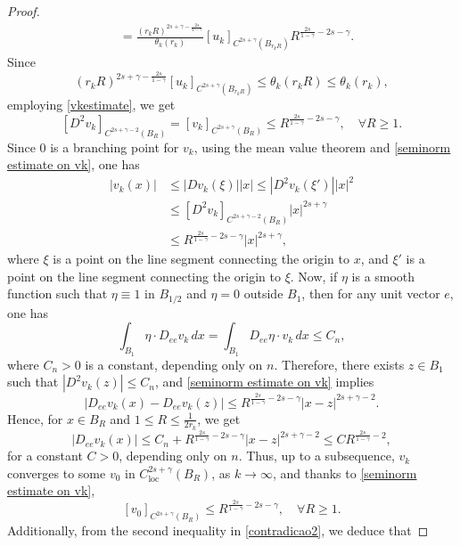 \documentclass[11pt,reqno]{amsart}
\numberwithin{equation}{section}
\numberwithin{theorem}{section}
\numberwithin{lemma}{section}
\numberwithin{corollary}{section}
\numberwithin{remark}{section}
\numberwithin{proposition}{section}
\numberwithin{definition}{section}
\newcommand{\loc}{\operatorname{loc}}
\begin{document}
\begin{proof}
\begin{equation}
\begin{split}
    &=\frac{(r_kR)^{2s+\gamma-\frac{2s}{1-\gamma}}}{\theta_k(r_k)}\left[u_k\right]_{C^{2s+\gamma}(B_{r_k R})}R^{\frac{2s}{1-\gamma}-2s-\gamma}.
    \end{split}
\end{equation}
Since
$$
(r_k R)^{2s+\gamma-\frac{2s}{1-\gamma}}\left[u_k\right]_{C^{2s+\gamma}(B_{r_k R})}\le\theta_k(r_k R)\le\theta_k(r_k),
$$
employing \eqref{vkestimate}, we get
\begin{equation}\label{seminorm estimate on vk}
    [D^2v_k]_{C^{2s+\gamma-2}(B_R)}=\left[v_k\right]_{C^{2s+\gamma}(B_R)}\le R^{\frac{2s}{1-\gamma}-2s-\gamma},\quad\forall R\ge1.
\end{equation}
Since $0$ is a branching point for $v_k$, using the mean value theorem and \eqref{seminorm estimate on vk}, one has
\begin{equation*}
    \begin{split}
        |v_k(x)|&\le |Dv_k(\xi)||x|\le |D^2v_k(\xi')||x|^2\\
        &\le[D^2v_k]_{C^{2s+\gamma-2}(B_R)}|x|^{2s+\gamma}\\
        &\le R^{\frac{2s}{1-\gamma}-2s-\gamma}|x|^{2s+\gamma},
    \end{split}
\end{equation*}
where $\xi$ is a point on the line segment connecting the origin to $x$, and $\xi'$ is a point on the line segment connecting the origin to $\xi$. Now, if $\eta$ is a smooth function such that $\eta \equiv 1$ in $B_{1/2}$ and $\eta = 0$ outside $B_1$, then for any unit vector $e$, one has
$$
\int_{B_1}\eta\cdot D_{ee} v_k\,dx=\int_{B_1}D_{ee}\eta\cdot v_k\,dx\leq C_n,
$$
where $C_n>0$ is a constant, depending only on $n$. Therefore, there exists $z\in B_1$ such that $|D^2v_k(z)|\leq C_n$, and \eqref{seminorm estimate on vk} implies 
$$
|D_{ee}v_k(x)-D_{ee}v_k(z)|\le R^{\frac{2s}{1-\gamma}-2s-\gamma}|x-z|^{2s+\gamma-2}.
$$
Hence, for $x\in B_R$ and $1\leq R \le\frac{1}{2r_k}$, we get
$$
|D_{ee}v_k(x)|\le C_n+ R^{\frac{2s}{1-\gamma}-2s-\gamma}|x-z|^{2s+\gamma-2}\le CR^{\frac{2s}{1-\gamma}-2},
$$
for a constant $C>0$, depending only on $n$. Thus, up to a subsequence, $v_k$ converges to some $v_0$ in $C^{2s+\gamma}_{\loc}(B_R)$, as $k\to\infty$, and thanks to \eqref{seminorm estimate on vk},
\begin{equation}\label{v0estimate}
\left[v_0\right]_{C^{2s+\gamma}(B_R)}\le R^{\frac{2s}{1-\gamma}-2s-\gamma}, \quad \forall R\ge1.
\end{equation}
Additionally, from the second inequality in \eqref{contradicao2}, we deduce that

\end{proof}
\end{document}

